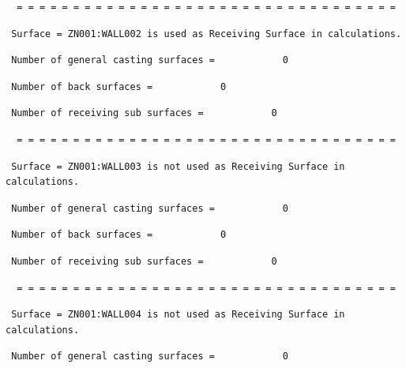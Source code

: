 \begin{lstlisting}
  = = = = = = = = = = = = = = = = = = = = = = = = = = = = = = = = = =
\end{lstlisting}

\begin{lstlisting}
 Surface = ZN001:WALL002 is used as Receiving Surface in calculations.
\end{lstlisting}

\begin{lstlisting}
 Number of general casting surfaces =            0
\end{lstlisting}

\begin{lstlisting}
 Number of back surfaces =            0
\end{lstlisting}

\begin{lstlisting}
 Number of receiving sub surfaces =            0
\end{lstlisting}

\begin{lstlisting}
  = = = = = = = = = = = = = = = = = = = = = = = = = = = = = = = = = =
\end{lstlisting}

\begin{lstlisting}
 Surface = ZN001:WALL003 is not used as Receiving Surface in calculations.
\end{lstlisting}

\begin{lstlisting}
 Number of general casting surfaces =            0
\end{lstlisting}

\begin{lstlisting}
 Number of back surfaces =            0
\end{lstlisting}

\begin{lstlisting}
 Number of receiving sub surfaces =            0
\end{lstlisting}

\begin{lstlisting}
  = = = = = = = = = = = = = = = = = = = = = = = = = = = = = = = = = =
\end{lstlisting}

\begin{lstlisting}
 Surface = ZN001:WALL004 is not used as Receiving Surface in calculations.
\end{lstlisting}

\begin{lstlisting}
 Number of general casting surfaces =            0
\end{lstlisting}

